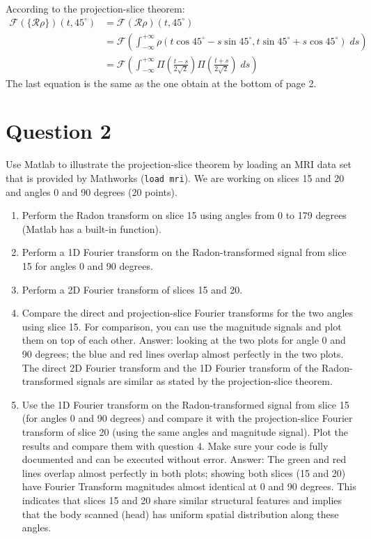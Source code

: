 \documentclass[12pt,twoside]{article}
\begin{document}
\begin{enumerate}
According to the projection-slice theorem:
\begin{align*}
    \mathcal{F} \left( \{ \mathcal{R} \rho \} \right)(t,  45^{\circ}) &= \mathcal{F} \left( \mathcal{R} \rho  \right)(t, 45^{\circ}) \\
    &= \mathcal{F} \left( \int_{-\infty}^{+\infty} \rho \left(t \cos{45^{\circ}} - s \sin {45^{\circ}}, t  \sin {45^{\circ}} + s \cos{45^{\circ}} \right) \; ds \right) \\
    &= \mathcal{F} \left( \int_{-\infty}^{+\infty} \Pi\left(\frac{t - s}{2 \sqrt{2}}\right) \Pi\left(\frac{t + s}{2 \sqrt{2}}\right) \; ds \right)
\end{align*}
The last equation is the same as the one obtain at the bottom of page 2.

  \end{enumerate}
\section*{Question 2}

\noindent
Use Matlab to illustrate the projection-slice theorem by loading an MRI data set that is provided by Mathworks (\texttt{load mri}). 
We are working on slices 15 and 20 and angles 0 and 90 degrees (20 points).

\begin{enumerate}
    \item Perform the Radon transform on slice 15 using angles from 0 to 179 degrees (Matlab has a built-in function).
    \item Perform a 1D Fourier transform on the Radon-transformed signal from slice 15 for angles 0 and 90 degrees.
    \item Perform a 2D Fourier transform of slices 15 and 20.
    \item Compare the direct and projection-slice Fourier transforms for the two angles using slice 15. 
    For comparison, you can use the magnitude signals and plot them on top of each other.
    Answer: looking at the two plots for angle 0 and 90 degrees; 
    the blue and red lines overlap almost perfectly in the two plots. The direct 2D Fourier transform and the 1D Fourier transform of the Radon-transformed signals
    are similar as stated by the projection-slice theorem.
    \item Use the 1D Fourier transform on the Radon-transformed signal from slice 15 (for angles 0 and 90 degrees) and 
    compare it with the projection-slice Fourier transform of slice 20 (using the same angles and magnitude signal). 
    Plot the results and compare them with question 4.
    Make sure your code is fully documented and can be executed without error.
    Answer: 
    The green and red lines overlap almost perfectly in both plots; showing both slices (15 and 20) have Fourier Transform magnitudes almost identical at 0 and 90 degrees.
    This indicates that slices 15 and 20 share similar structural features and implies that the body scanned (head) has uniform spatial distribution along these angles.
\end{enumerate}
\end{document}
